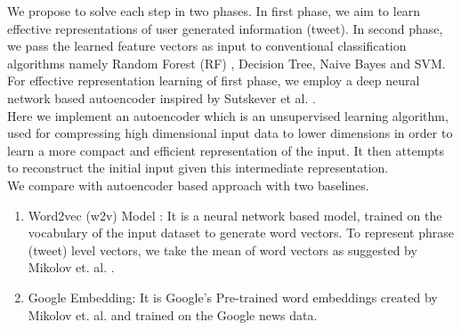 \documentclass[a4paper,11pt]{article}
\begin{document}
We propose to solve each step in two phases. In first phase, we aim to learn effective representations of user generated information (tweet). In second phase, we pass the learned feature vectors as input to conventional classification algorithms namely Random Forest (RF) , Decision Tree, Naive Bayes and SVM.\medskip\\
For effective representation learning of first phase, we employ a deep neural network based autoencoder inspired by Sutskever et al. \cite{sutskever2014sequence}. \medskip\\
Here we implement an autoencoder which is an unsupervised learning algorithm, used for compressing high dimensional input data to lower dimensions in order to learn a more compact and efficient representation of the input. It then attempts to reconstruct the initial input given this intermediate representation.\medskip\\
\newpage
We compare with autoencoder based approach with two baselines.
\begin{enumerate}
    \item Word2vec (w2v) Model \cite{mikolov2013efficient}: It is a neural network based model, trained on the vocabulary of the input dataset to generate word vectors. To represent phrase (tweet) level vectors, we take the mean of word vectors as suggested by Mikolov et. al. \cite{mikolov2013distributed}. 
    \medskip\\
    \item Google Embedding: It is Google's Pre-trained word embeddings created by Mikolov et. al. \cite{mikolov2013distributed} and trained on the Google news data. 
\end{enumerate}


\newpage
    
\end{document}
